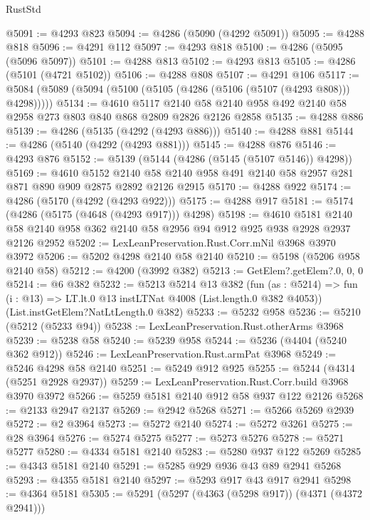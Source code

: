 \begin{lexlean}{RustStd}
\begin{coremodule}
@5091 := @4293 @823
@5094 := @4286 (@5090 (@4292 @5091))
@5095 := @4288 @818
@5096 := @4291 @112
@5097 := @4293 @818
@5100 := @4286 (@5095 (@5096 @5097))
@5101 := @4288 @813
@5102 := @4293 @813
@5105 := @4286 (@5101 (@4721 @5102))
@5106 := @4288 @808
@5107 := @4291 @106
@5117 := @5084 (@5089 (@5094 (@5100 (@5105 (@4286 (@5106 (@5107 (@4293 @808))) @4298)))))
@5134 := @4610
    @5117
    @2140
    @58
    @2140
    @958
    @492
    @2140
    @58
    @2958
    @273
    @803
    @840
    @868
    @2809
    @2826
    @2126
    @2858
@5135 := @4288 @886
@5139 := @4286 (@5135 (@4292 (@4293 @886)))
@5140 := @4288 @881
@5144 := @4286 (@5140 (@4292 (@4293 @881)))
@5145 := @4288 @876
@5146 := @4293 @876
@5152 := @5139 (@5144 (@4286 (@5145 (@5107 @5146)) @4298))
@5169 := @4610
    @5152
    @2140
    @58
    @2140
    @958
    @491
    @2140
    @58
    @2957
    @281
    @871
    @890
    @909
    @2875
    @2892
    @2126
    @2915
@5170 := @4288 @922
@5174 := @4286 (@5170 (@4292 (@4293 @922)))
@5175 := @4288 @917
@5181 := @5174 (@4286 (@5175 (@4648 (@4293 @917))) @4298)
@5198 := @4610
    @5181
    @2140
    @58
    @2140
    @958
    @362
    @2140
    @58
    @2956
    @94
    @912
    @925
    @938
    @2928
    @2937
    @2126
    @2952
@5202 := LexLeanPreservation.Rust.Corr.mNil @3968 @3970 @3972
@5206 := @5202 @4298 @2140 @58 @2140
@5210 := @5198 (@5206 @958 @2140 @58)
@5212 := @4200 (@3992 @382)
@5213 := GetElem?.getElem?.{0, 0, 0}
@5214 := @6 @382
@5232 := @5213
    @5214
    @13
    @382
    (fun (as : @5214) =>
    fun (i : @13) => LT.lt.{0} @13 instLTNat @4008 (List.length.{0} @382 @4053))
    (List.instGetElem?NatLtLength.{0} @382)
@5233 := @5232 @958
@5236 := @5210 (@5212 (@5233 @94))
@5238 := LexLeanPreservation.Rust.otherArms @3968
@5239 := @5238 @58
@5240 := @5239 @958
@5244 := @5236 (@4404 (@5240 @362 @912))
@5246 := LexLeanPreservation.Rust.armPat @3968
@5249 := @5246 @4298 @58 @2140
@5251 := @5249 @912 @925
@5255 := @5244 (@4314 (@5251 @2928 @2937))
@5259 := LexLeanPreservation.Rust.Corr.build @3968 @3970 @3972
@5266 := @5259 @5181 @2140 @912 @58 @937 @122 @2126
@5268 := @2133 @2947 @2137
@5269 := @2942 @5268
@5271 := @5266 @5269 @2939
@5272 := @2 @3964
@5273 := @5272 @2140
@5274 := @5272 @3261
@5275 := @28 @3964
@5276 := @5274 @5275
@5277 := @5273 @5276
@5278 := @5271 @5277
@5280 := @4334 @5181 @2140
@5283 := @5280 @937 @122 @5269
@5285 := @4343 @5181 @2140
@5291 := @5285 @929 @936 @43 @89 @2941 @5268
@5293 := @4355 @5181 @2140
@5297 := @5293 @917 @43 @917 @2941
@5298 := @4364 @5181
@5305 := @5291 (@5297 (@4363 (@5298 @917)) (@4371 (@4372 @2941)))

\end{coremodule}
\end{lexlean}
